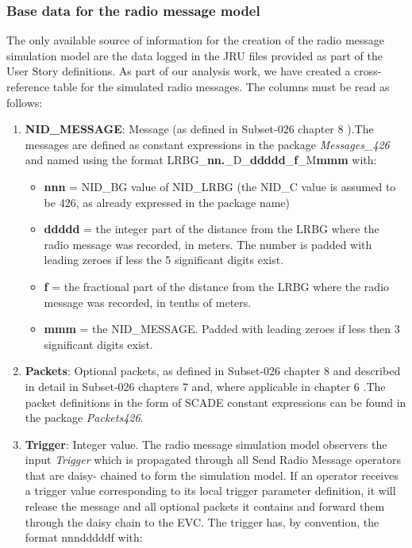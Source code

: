 \documentclass{template/openetcs_article}
\begin{document}
\subsubsection{Base data for the radio message model}
The only available source of information for the creation of the radio message simulation model are the data logged in the JRU files provided as part of the User Story definitions.\newline
As part of our analysis work, we have created a cross- reference table for the simulated radio messages.\newline
The columns must be read as follows:
\begin{enumerate}
 \item \textbf{NID\_MESSAGE}: Message (as defined in Subset-026 chapter 8 \cite{SRS026-8}).\newline The messages are defined as constant expressions in the package \emph{Messages\_426} and named using the format LRBG\_\textbf{nn.}\_D\_\textbf{ddddd}\_\textbf{f}\_M\textbf{mmm} with:
	\begin{itemize}
	 \item \textbf{nnn} = NID\_BG value of NID\_LRBG (the NID\_C value is assumed to be 426, as already expressed in the package name)
	 \item \textbf{ddddd} = the integer part of the distance from the LRBG where the radio message was recorded, in meters. The number is padded with leading zeroes if less the 5 significant digits exist.
	 \item \textbf{f} = the fractional part of the distance from the LRBG where the radio message was recorded, in tenths of meters.
	 \item \textbf{mmm} = the NID\_MESSAGE. Padded with leading zeroes if less then 3 significant digits exist.
	\end{itemize}
 \item \textbf{Packets}: Optional packets, as defined in Subset-026 chapter 8 \cite{SRS026-8} and described in detail in Subset-026 chapters 7 \cite{SRS026-7} and, where applicable in chapter 6 \cite{SRS026-6}.\newline The packet definitions in the form of SCADE constant expressions can be found in the package \emph{Packets426}. 
 \item \textbf{Trigger}: Integer value. The radio message simulation model observers the input \emph{Trigger} which is propagated through all Send Radio Message operators that are daisy- chained to form the simulation model. If an operator receives a trigger value corresponding to its local trigger parameter definition, it will release the message and all optional packets it contains and forward them through the daisy chain to the EVC. The trigger has, by convention, the format nnndddddf with:

\end{enumerate}
\end{document}
